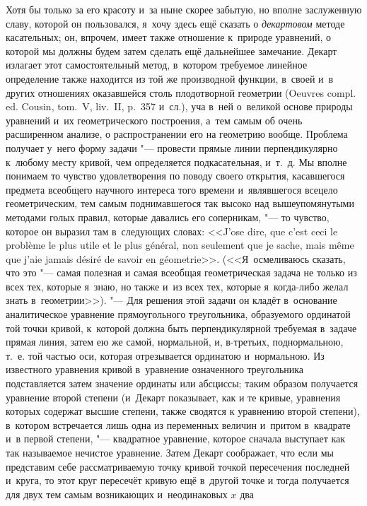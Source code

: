 Хотя бы только за его красоту и~за ныне скорее забытую, но вполне заслуженную
славу, которой он пользовался, я~хочу здесь ещё сказать о {\em декартовом}
методе касательных; он, впрочем, имеет также отношение к~природе уравнений, о
которой мы должны будем затем сделать ещё дальнейшее замечание. Декарт излагает
этот самостоятельный метод, в~котором требуемое линейное определение также
находится из той же производной функции, в~своей и~в других отношениях
оказавшейся столь плодотворной геометрии (Oeuvres compl. ed. Cousin, tom.~V,
liv.~II, p.~357 и~сл.), уча в~ней о~великой основе природы уравнений и~их
геометрического построения, а~тем самым об очень расширенном анализе, о
распространении его на геометрию вообще. Проблема получает у~него форму задачи
"--- провести прямые линии перпендикулярно к~любому месту кривой, чем
определяется подкасательная, и~т.~д. Мы вполне понимаем то чувство
удовлетворения по поводу своего открытия, касавшегося предмета всеобщего
научного интереса того времени и~являвшегося всецело геометрическим, тем самым
поднимавшегося так высоко над вышеупомянутыми методами голых правил, которые
давались его соперникам, "--- то чувство, которое он выразил там в~следующих
словах: <<J’ose dire, que c’est ceci le problème le plus utile et le plus
général, non seulement que je sache, mais même que j’aie jamais désiré de
savoir en géometrie>>. (<<Я~осмеливаюсь сказать, что это "--- самая полезная и
самая всеобщая геометрическая задача не только из всех тех, которые я~знаю, но
также и~из всех тех, которые я~когда-либо желал знать в~геометрии>>). "--- Для
решения этой задачи он кладёт в~основание аналитическое уравнение
прямоугольного треугольника, образуемого ординатой той точки кривой, к~которой
должна быть перпендикулярной требуемая в~задаче прямая линия, затем ею же
самой, нормальной, и, в-третьих, поднормальною, т.~е. той частью оси, которая
отрезывается ординатою и~нормальною. Из известного уравнения кривой в~уравнение
означенного треугольника подставляется затем значение ординаты или абсциссы;
таким образом получается уравнение второй степени (и~Декарт показывает, как и
те кривые, уравнения которых содержат высшие степени, также сводятся к
уравнению второй степени), в~котором встречается лишь одна из переменных
величин и~притом в~квадрате и~в первой степени, "--- квадратное уравнение,
которое сначала выступает как так называемое нечистое уравнение. Затем Декарт
соображает, что если мы представим себе рассматриваемую точку кривой точкой
пересечения последней и~круга, то этот круг пересечёт кривую ещё в~другой точке
и тогда получается для двух тем самым возникающих и~неодинаковых $x$ два
